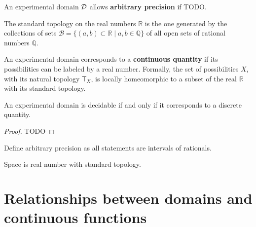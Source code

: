 \documentclass[11pt,letterpaper,fleqn]{memoir} %
\begin{document}
\begin{mathSection}
	
	\begin{defn}
		An experimental domain $\mathcal{D}$ allows \textbf{arbitrary precision} if TODO.
	\end{defn}
	
	\begin{defn}
		The standard topology on the real numbers $\mathbb{R}$ is the one generated by the collections of sets $\mathcal{B} = \{ (a,b) \subset \mathbb{R} \; | \; a,b \in \mathbb{Q} \}$ of all open sets of rational numbers $\mathbb{Q}$.
	\end{defn}
	
	\begin{defn}
		An experimental domain corresponds to a \textbf{continuous quantity} if its possibilities can be labeled by a real number. Formally, the set of possibilities $X$, with its natural topology $\mathsf{T}_X$, is locally homeomorphic to a subset of the real $\mathbb{R}$ with its standard topology.
	\end{defn}
	
	\begin{prop}
		An experimental domain is decidable if and only if it corresponds to a discrete quantity.
	\end{prop}
	
	\begin{proof}
		TODO
	\end{proof}	
\end{mathSection}


Define arbitrary precision as all statements are intervals of rationals.

Space is real number with standard topology.

\section{Relationships between domains and continuous functions}
\end{document}
